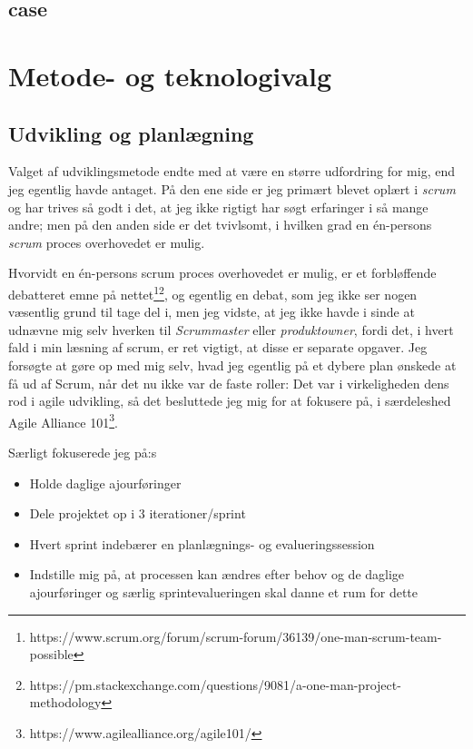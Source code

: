 \documentclass{report}
\begin{document}
\section{case}



\chapter{Metode- og teknologivalg}

\section{Udvikling og planlægning}
Valget af udviklingsmetode endte med at være en større udfordring for mig, end jeg egentlig havde antaget. På den ene side er jeg primært blevet oplært i \textit{scrum} og har trives så godt i det, at jeg ikke rigtigt har søgt erfaringer i så mange andre; men på den anden side er det tvivlsomt, i hvilken grad en én-persons \textit{scrum} proces overhovedet er mulig.\par{}
Hvorvidt en én-persons scrum proces overhovedet er mulig, er et forbløffende debatteret emne på nettet\footnote{https://www.scrum.org/forum/scrum-forum/36139/one-man-scrum-team-possible}\footnote{https://pm.stackexchange.com/questions/9081/a-one-man-project-methodology}, og egentlig en debat, som jeg  ikke ser nogen væsentlig grund til tage del i, men jeg vidste, at jeg ikke havde i sinde at udnævne mig selv hverken til \textit{Scrummaster} eller \textit{produktowner}, fordi det, i hvert fald i min læsning af scrum, er ret vigtigt, at disse er separate opgaver. Jeg forsøgte at gøre op med mig selv, hvad jeg egentlig på et dybere plan ønskede at få ud af Scrum, når det nu ikke var de faste roller: Det var i virkeligheden dens rod i agile udvikling, så det besluttede jeg mig for at fokusere på, i særdeleshed Agile Alliance 101\footnote{https://www.agilealliance.org/agile101/}.\par{}

Særligt fokuserede jeg på:s
\begin{itemize}
\item Holde daglige ajourføringer
\item Dele projektet op i 3 iterationer/sprint
\item Hvert sprint indebærer en planlægnings- og evalueringssession
\item Indstille mig på, at processen kan ændres efter behov og de daglige ajourføringer og særlig sprintevalueringen skal danne et rum for dette
\end{itemize}
\end{document}
